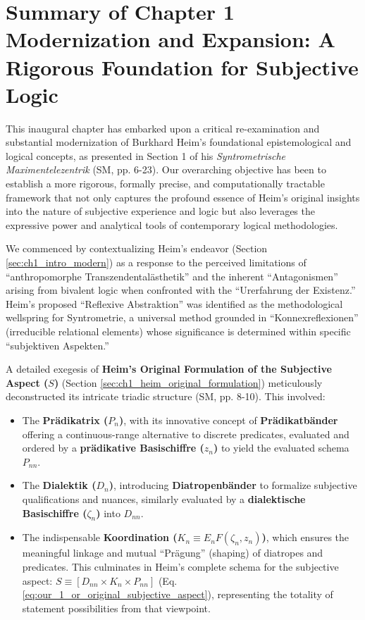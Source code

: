 \documentclass[
    12pt,              %
    a4paper,           %
    headings=normal,   %
    twoside=true,      %
    BCOR=8mm,          %
]{scrbook}
\newcommand{\q}[1]{\enquote{#1}}
\newcommand{\subjektiveraspekt}{S}
\newcommand{\pradikatrix}{P_n}
\newcommand{\dialektik}{D_n}
\newcommand{\koordination}{K_n}
\begin{document}
\section{Summary of Chapter 1 Modernization and Expansion: A Rigorous Foundation for Subjective Logic}
\label{sec:ch1_summary_modernization} 

This inaugural chapter has embarked upon a critical re-examination and substantial modernization of Burkhard Heim's foundational epistemological and logical concepts, as presented in Section 1 of his \textit{Syntrometrische Maximentelezentrik} (SM, pp. 6-23). Our overarching objective has been to establish a more rigorous, formally precise, and computationally tractable framework that not only captures the profound essence of Heim's original insights into the nature of subjective experience and logic but also leverages the expressive power and analytical tools of contemporary logical methodologies.

We commenced by contextualizing Heim's endeavor (Section \ref{sec:ch1_intro_modern}) as a response to the perceived limitations of \q{anthropomorphe Transzendentalästhetik} and the inherent \q{Antagonismen} arising from bivalent logic when confronted with the \q{Urerfahrung der Existenz.} Heim's proposed \q{Reflexive Abstraktion} was identified as the methodological wellspring for Syntrometrie, a universal method grounded in \q{Konnexreflexionen} (irreducible relational elements) whose significance is determined within specific \q{subjektiven Aspekten.}

A detailed exegesis of \textbf{Heim’s Original Formulation of the Subjective Aspect (\(\subjektiveraspekt\))} (Section \ref{sec:ch1_heim_original_formulation}) meticulously deconstructed its intricate triadic structure (SM, pp. 8-10). This involved:
\begin{itemize}
    \item   The \textbf{Prädikatrix (\(\pradikatrix\))}, with its innovative concept of \textbf{Prädikatbänder} offering a continuous-range alternative to discrete predicates, evaluated and ordered by a \textbf{prädikative Basischiffre (\(z_n\))} to yield the evaluated schema \(P_{nn}\).
    \item   The \textbf{Dialektik (\(\dialektik\))}, introducing \textbf{Diatropenbänder} to formalize subjective qualifications and nuances, similarly evaluated by a \textbf{dialektische Basischiffre (\(\zeta_n\))} into \(D_{nn}\).
    \item   The indispensable \textbf{Koordination (\(\koordination \equiv E_n F(\zeta_n, z_n)\))}, which ensures the meaningful linkage and mutual \q{Prägung} (shaping) of diatropes and predicates. This culminates in Heim's complete schema for the subjective aspect: \(S \equiv [ D_{nn} \times \koordination \times P_{nn} ]\) (Eq. \eqref{eq:our_1_or_original_subjective_aspect}), representing the totality of statement possibilities from that viewpoint.
\end{itemize}
\end{document}

